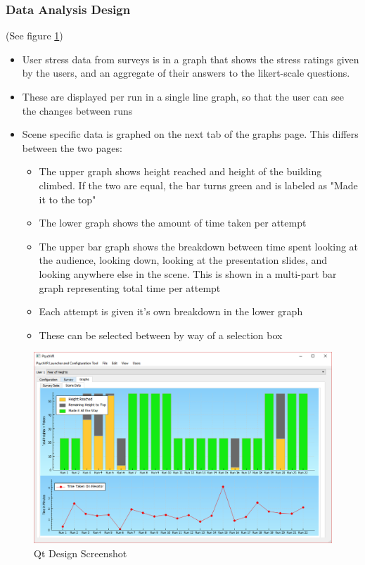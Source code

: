 \documentclass[a4paper,10pt]{article}
\begin{document}
\subsubsection{Data Analysis Design}
(See figure \ref{fig:qtMockupData})
  \begin{itemize}
  \item User stress data from surveys is in a graph that shows the stress ratings given by the users, and an aggregate of their answers to the likert-scale questions.
  \item These are displayed per run in a single line graph, so that the user can see the changes between runs
  \item Scene specific data is graphed on the next tab of the graphs page.  This differs between the two pages:
	\begin{itemize}
	\item The upper graph shows height reached and height of the building climbed.  If the two are equal, the bar turns green and is labeled as "Made it to the top"
	\item The lower graph shows the amount of time taken per attempt
	\item The upper bar graph shows the breakdown between time spent looking at the audience, looking down, looking at the presentation slides, and looking anywhere else in the scene.  This is shown in a multi-part bar graph representing total time per attempt
	\item Each attempt is given it's own breakdown in the lower graph
	\item These can be selected between by way of a selection box
	\end{itemize}
  \end{itemize}
\begin{figure}[H]
				    \centerline{\includegraphics[scale = 0.5]{qtHeightGraph.png}}
					\caption{Qt Design Screenshot}
					\label{fig:qtMockupData}
				\end{figure}
\end{document}
